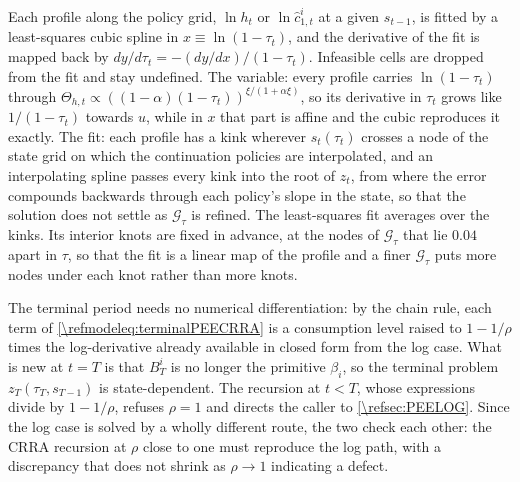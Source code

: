 Each profile along the policy grid, $\ln h_t$ or $\ln\hat{c}_{1,t}^i$ at a given $s_{t-1}$, is fitted by a least-squares cubic spline in $x \equiv \ln(1-\tau_t)$, and the derivative of the fit is mapped back by $dy/d\tau_t = -(dy/dx)/(1-\tau_t)$. Infeasible cells are dropped from the fit and stay undefined. The variable: every profile carries $\ln(1-\tau_t)$ through $\Theta_{h,t}\propto\left((1-\alpha)(1-\tau_t)\right)^{\xi/(1+\alpha\xi)}$, so its derivative in $\tau_t$ grows like $1/(1-\tau_t)$ towards $u$, while in $x$ that part is affine and the cubic reproduces it exactly. The fit: each profile has a kink wherever $s_t(\tau_t)$ crosses a node of the state grid on which the continuation policies are interpolated, and an interpolating spline passes every kink into the root of $z_t$, from where the error compounds backwards through each policy's slope in the state, so that the solution does not settle as $\mathcal{G}_{\tau}$ is refined. The least-squares fit averages over the kinks. Its interior knots are fixed in advance, at the nodes of $\mathcal{G}_{\tau}$ that lie $0.04$ apart in $\tau$, so that the fit is a linear map of the profile and a finer $\mathcal{G}_{\tau}$ puts more nodes under each knot rather than more knots.

The terminal period needs no numerical differentiation: by the chain rule, each term of \eqref{\refmodeleq:terminalPEECRRA} is a consumption level raised to $1-1/\rho$ times the log-derivative already available in closed form from the log case. What is new at $t=T$ is that $B_T^i$ is no longer the primitive $\beta_i$, so the terminal problem $z_T(\tau_T, s_{T-1})$ is state-dependent. The recursion at $t<T$, whose expressions divide by $1-1/\rho$, refuses $\rho = 1$ and directs the caller to \cref{\refsec:PEELOG}. Since the log case is solved by a wholly different route, the two check each other: the CRRA recursion at $\rho$ close to one must reproduce the log path, with a discrepancy that does not shrink as $\rho\rightarrow1$ indicating a defect.

